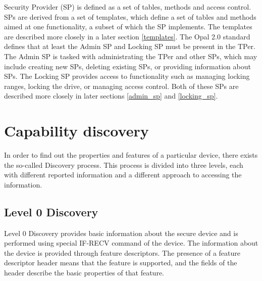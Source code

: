 Security Provider (SP) is defined as a set of tables, methods and access control. SPs are derived from a set of templates, which define a set of tables and methods aimed at one functionality, a subset of which the SP implements. The templates are described more closely in a later section \ref{templates}.
The Opal 2.0 standard defines that at least the Admin SP and Locking SP must be present in the TPer. The Admin SP is tasked with administrating the TPer and other SPs, which may include creating new SPs, deleting existing SPs, or providing information about SPs. The Locking SP provides access to functionality such as managing locking ranges, locking the drive, or managing access control. Both of these SPs are described more closely in later sections \ref{admin_sp} and \ref{locking_sp}.

\section{Capability discovery}

In order to find out the properties and features of a particular device, there exists the so-called Discovery process. 
This process is divided into three levels, each with different reported information and a different approach to accessing the information.

\subsection{Level 0 Discovery}

Level 0 Discovery provides basic information about the secure device and is performed using special IF-RECV command of the device. The information about the device is provided through feature descriptors. The presence of a feature descriptor header means that the feature is supported, and the fields of the header describe the basic properties of that feature.

